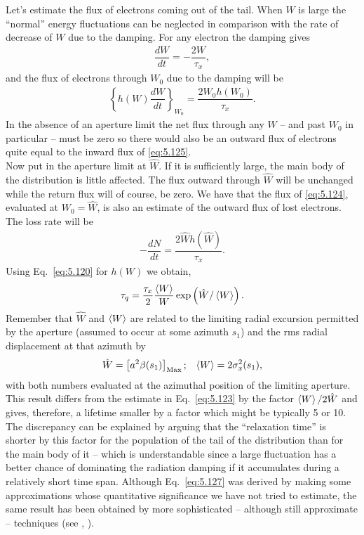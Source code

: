 Let's estimate the flux of electrons coming out of the tail. When $W$ is large the ``normal'' energy fluctuations can be neglected in comparison with the rate of decrease of $W$ due to the damping. For any electron the damping gives
\begin{align}\label{eq:5.124}
	\dfrac{dW}{dt} = - \dfrac{2W}{\tau_x},
\end{align}
and the flux of electrons through $W_0$ due to the damping will be
\begin{align}\label{eq:5.125}
	\left\lbrace h(W) \dfrac{dW}{dt} \right\rbrace_{W_0} = \dfrac{2 W_0 h(W_0)}{\tau_x}.
\end{align}
In the absence of an aperture limit the net flux through any $W$ -- and past $W_0$ in particular
 -- must be zero so there would also be an outward flux of electrons quite equal to the inward flux of \eqref{eq:5.125}.\\
Now put in the aperture limit at $\hat{W}$. If it is sufficiently large, the main body of the distribution is little affected. The flux outward through $\hat{W}$ will be unchanged while the return flux will of course, be zero. We have that the flux of \eqref{eq:5.124}, evaluated at $W_0 = \hat{W}$, is also an estimate of the outward flux of lost electrons. The loss rate will be
\begin{align}
	-\dfrac{dN}{dt} = \dfrac{2\hat{W}h(\hat{W})}{\tau_x}.
\end{align}
Using Eq.~\eqref{eq:5.120} for $h(W)$ we obtain,
\begin{align}\label{eq:5.127}
	\tau_q = \dfrac{\tau_x}{2} \dfrac{\left< W \right>}{W} \exp \left( \hat{W}/\left< W \right> \right).
\end{align}
Remember that $\hat{W}$ and $\left< W \right>$ are related to the limiting radial excursion permitted by the aperture (assumed to occur at some azimuth $s_1$) and the rms radial displacement at that azimuth by
\begin{align}
	\hat{W} = \left[ a^2 \beta(s_1) \right]_\text{Max}; && \left< W \right> = 2\sigma_x^2(s_1),
\end{align}
with both numbers evaluated at the azimuthal position of the limiting aperture.\\
This result differs from the estimate in Eq.~\eqref{eq:5.123} by the factor $\left< W \right>/2\hat{W}$ and gives, therefore, a lifetime smaller by a factor which might be typically 5 or 10. The discrepancy can be explained by arguing that the ``relaxation time'' is shorter by this factor for the population of the tail of the distribution than for the main body of it -- which is understandable since a large fluctuation has a better chance of dominating the radiation damping if it accumulates during a relatively short time span. Although Eq.~\eqref{eq:5.127} was derived by making some approximations whose quantitative significance we have not tried to estimate, the same result has been obtained by more sophisticated -- although still approximate -- techniques (see \cite{5}, \cite{15}).\\
